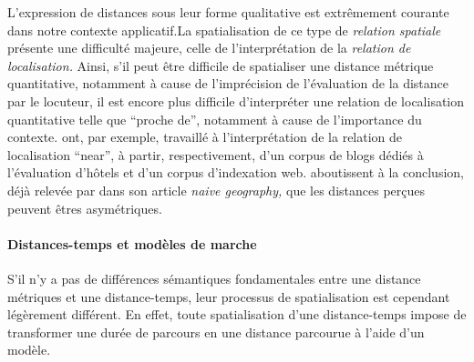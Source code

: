 
L'expression de distances sous leur forme qualitative est extrêmement
courante dans notre contexte applicatif.La spatialisation de ce type
de \emph{relation spatiale} présente une difficulté majeure, celle de
l'interprétation de la \emph{relation de localisation.} Ainsi, s'il
peut être difficile de spatialiser une distance métrique quantitative,
notamment à cause de l'imprécision de l'évaluation de la distance par
le locuteur, il est encore plus difficile d’interpréter une relation
de localisation quantitative telle que \enquote{proche de}, notamment
à cause de l'importance du
contexte. \textcite{Wallgrun2004,Derungs2016} ont, par exemple,
travaillé à l'interprétation de la relation de localisation
\enquote{near}, à partir, respectivement, d'un corpus de blogs dédiés
à l'évaluation d'hôtels et d'un corpus d'indexation
web. \textcite{Wallgrun2004} aboutissent à la conclusion, déjà relevée
par \textcite{Egenhofer1995} dans son article \emph{naive geography,}
que les distances perçues peuvent êtres asymétriques.

\paragraph{Distances-temps et modèles de marche}



S'il n'y a pas de différences sémantiques fondamentales entre une
distance métriques et une distance-temps, leur processus de
spatialisation est cependant légèrement différent. En effet, toute
spatialisation d'une distance-temps impose de transformer une durée de
parcours en une distance parcourue à l'aide d'un modèle.

